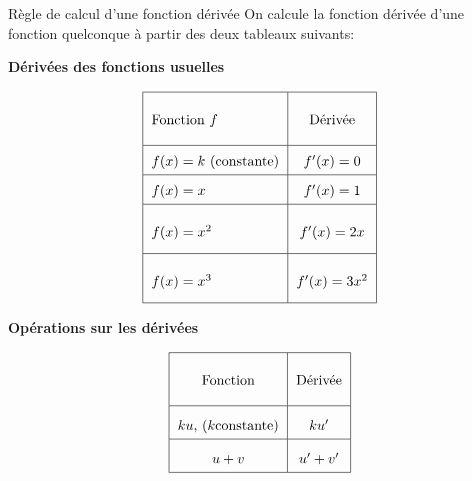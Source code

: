 \documentclass[10pt,a4paper,openany,twoside, eleve]{book}
\begin{document}
\begin{prop}{Règle de calcul d'une fonction dérivée}{}
  On calcule la fonction dérivée d'une fonction quelconque à partir
  des deux tableaux suivants:


  \begin{minipage}[t]{.5\textwidth}
    \centerline{\bf{Dérivées des fonctions usuelles}}

    \[\begin{tabular}{|l|c|}\hline
        \raisebox{0.4cm}[1.2cm]{Fonction $f$}         &
        \raisebox{0.4cm}[1.2cm]{Dérivée}
        \\\hline
        \raisebox{0.1cm}[0.6cm]{$f(x)=k$ (constante)} &
        \raisebox{0.1cm}[0.6cm]{$f'(x)=0$}
        \\\hline
        \raisebox{0.1cm}[0.6cm]{$f(x)=x$}             &
        \raisebox{0.1cm}[0.6cm]{$f'(x)=1$}
        \\\hline
        \raisebox{0.3cm}[1.1cm]{$f(x)=x^2$}           &
        \raisebox{0.3cm}[1.1cm]{$f'(x)=2x$}
        \\\hline
        \raisebox{0.3cm}[1.1cm]{$f(x)=x^3$}           &
        \raisebox{0.3cm}[1.1cm]{$f'(x)=3x^2$}
        \\\hline
      \end{tabular}\]
  \end{minipage}
  \begin{minipage}[t]{.5\textwidth}
    \centerline{\bf{Opérations sur les dérivées}}

    \[\begin{tabular}{|c|c|}\hline
        \raisebox{0.4cm}[1.2cm]{Fonction}                     &
        \raisebox{0.4cm}[1.2cm]{Dérivée}
        \\\hline
        \raisebox{0.1cm}[0.7cm]{$ku$, $(k \text{constante})$} &
        \raisebox{0.1cm}[0.7cm]{$ku'$}
        \\\hline
        \raisebox{0.1cm}[0.7cm]{$u+v$}                        &
        \raisebox{0.1cm}[0.7cm]{$u'+v'$}
        \\\hline
      \end{tabular}\]
  \end{minipage}
\end{prop}
\end{document}
